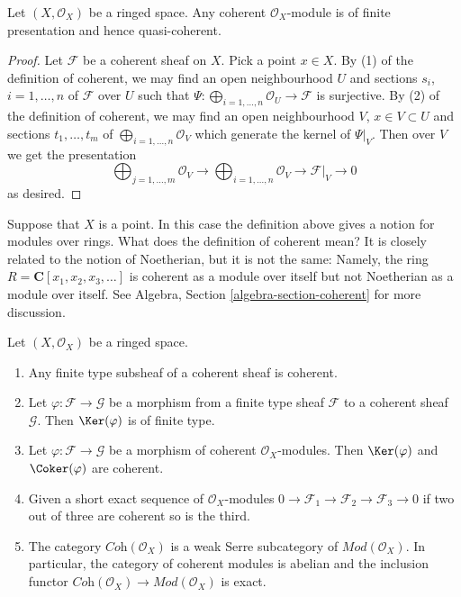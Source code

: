 \begin{lemma}
\label{lemma-coherent-finite-presentation}
Let $(X, \mathcal{O}_X)$ be a ringed space.
Any coherent $\mathcal{O}_X$-module is of finite presentation
and hence quasi-coherent.
\end{lemma}

\begin{proof}
Let $\mathcal{F}$ be a coherent sheaf on $X$.
Pick a point $x \in X$.
By (1) of the definition of coherent, we may find an open neighbourhood $U$
and sections $s_i$, $i = 1, \ldots, n$ of $\mathcal{F}$ over $U$
such that $\Psi : \bigoplus_{i = 1, \ldots, n} \mathcal{O}_U \to \mathcal{F}$
is surjective. By (2) of the definition of coherent, we may find
an open neighbourhood $V$, $x \in V \subset U$ and sections
$t_1, \ldots, t_m$ of $\bigoplus_{i = 1, \ldots, n} \mathcal{O}_V$
which generate the kernel of $\Psi|_V$. Then over $V$ we get the
presentation
$$
\bigoplus\nolimits_{j = 1, \ldots, m}
\mathcal{O}_V
\longrightarrow
\bigoplus\nolimits_{i = 1, \ldots, n}
\mathcal{O}_V
\to
\mathcal{F}|_V
\to
0
$$
as desired.
\end{proof}

\begin{example}
\label{example-coherent-not-Noetherian}
Suppose that $X$ is a point. In this case the definition
above gives a notion for modules over rings.
What does the definition of coherent mean?
It is closely related to the notion of Noetherian,
but it is not the same: Namely, the ring
$R = \mathbf{C}[x_1, x_2, x_3, \ldots]$ is coherent
as a module over itself but not Noetherian as a module
over itself. See Algebra, Section \ref{algebra-section-coherent}
for more discussion.
\end{example}

\begin{lemma}
\label{lemma-coherent-abelian}
Let $(X, \mathcal{O}_X)$ be a ringed space.
\begin{enumerate}
\item Any finite type subsheaf of a coherent sheaf is coherent.
\item Let $\varphi : \mathcal{F} \to \mathcal{G}$
be a morphism from a finite type sheaf $\mathcal{F}$
to a coherent sheaf $\mathcal{G}$. Then $\Ker(\varphi)$ is of finite type.
\item Let $\varphi : \mathcal{F} \to \mathcal{G}$ be a morphism
of coherent $\mathcal{O}_X$-modules. Then
$\Ker(\varphi)$ and
$\Coker(\varphi)$ are coherent.
\item Given a short exact sequence of $\mathcal{O}_X$-modules
$0 \to \mathcal{F}_1 \to \mathcal{F}_2 \to \mathcal{F}_3 \to 0$
if two out of three are coherent so is the third.
\item The category $\textit{Coh}(\mathcal{O}_X)$ is a weak Serre subcategory
of $\textit{Mod}(\mathcal{O}_X)$. In particular, the category of
coherent modules is abelian and the inclusion functor
$\textit{Coh}(\mathcal{O}_X) \to \textit{Mod}(\mathcal{O}_X)$
is exact.
\end{enumerate}
\end{lemma}

